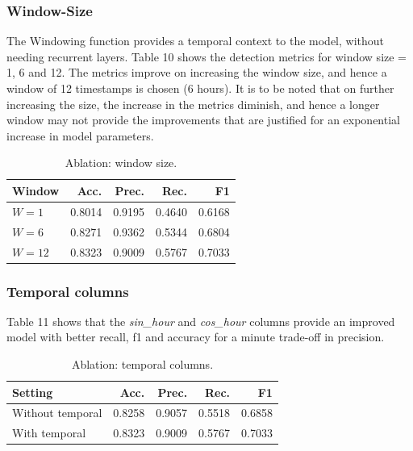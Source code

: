 \documentclass[final,5p,times,twocolumn,authoryear]{elsarticle}
\begin{document}
\subsubsection*{\textbf{Window-Size}}

The Windowing function provides a temporal context to the model, without needing recurrent layers. Table 10 shows the detection metrics for window size = 1, 6 and 12. The metrics improve on increasing the window size, and hence a window of 12 timestamps is chosen (6 hours). It is to be noted that on further increasing the size, the increase in the metrics diminish, and hence a longer window may not provide the improvements that are justified for an exponential increase in model parameters.

\begin{table}[H]
\centering
\caption{Ablation: window size.}
\label{tab:abl_window}
\small
\begin{tabular}{@{}lrrrr@{}}
\toprule
\textbf{Window} & \textbf{Acc.} & \textbf{Prec.} & \textbf{Rec.} & \textbf{F1} \\ \midrule
$W=1$  & 0.8014 & 0.9195 & 0.4640 & 0.6168 \\
$W=6$  & 0.8271 & 0.9362 & 0.5344 & 0.6804 \\
$W=12$ & 0.8323 & 0.9009 & 0.5767 & 0.7033 \\ 
\bottomrule
\end{tabular}
\end{table}

\subsubsection*{\textbf{Temporal columns}}

Table 11 shows that the \textit{sin\_hour} and \textit{cos\_hour} columns provide an improved model with better recall, f1 and accuracy for a minute trade-off in precision.

\begin{table}[H]
\centering
\caption{Ablation: temporal columns.}
\label{tab:abl_temporal}
\small
\begin{tabular}{@{}lrrrr@{}}
\toprule
\textbf{Setting} & \textbf{Acc.} & \textbf{Prec.} & \textbf{Rec.} & \textbf{F1} \\ \midrule
Without temporal & 0.8258 & 0.9057 & 0.5518 & 0.6858 \\
With temporal    & 0.8323 & 0.9009 & 0.5767 & 0.7033 \\ 
\bottomrule
\end{tabular}
\end{table}
\end{document}
